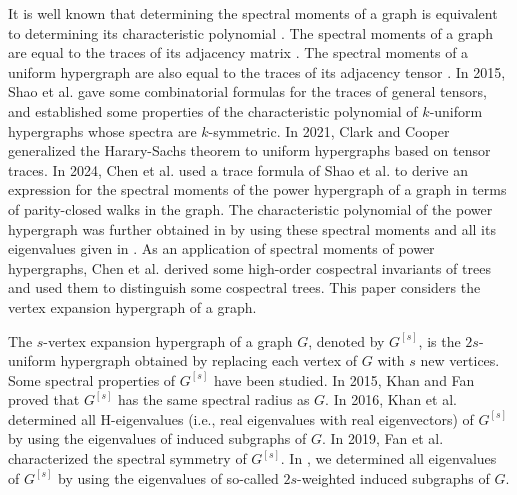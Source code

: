 \documentclass{article}
\begin{document}
It is well known that determining the spectral moments of a graph is equivalent to determining its characteristic polynomial \cite{van2003graphs}.
The spectral moments of a graph are equal to the traces of its adjacency matrix \cite{cvetkovic1980spectra}.
The spectral moments of a uniform hypergraph are also equal to the traces of its adjacency tensor \cite{hu2013determinants}.
In 2015,
Shao et al. \cite{shao2015some} gave some combinatorial formulas for the traces of general tensors,
and established some properties of the characteristic polynomial of $k$-uniform hypergraphs whose spectra are $k$-symmetric.
In 2021,
Clark and Cooper \cite{clark2021harary} generalized the Harary-Sachs theorem to uniform hypergraphs based on tensor traces.
In 2024,
Chen et al. \cite{chen2024spectra} used a trace formula of Shao et al. to derive an expression for the spectral moments of the power hypergraph of a graph in terms of parity-closed walks in the graph.
The characteristic polynomial of the power hypergraph was further obtained in \cite{chen2024spectra} by using these spectral moments and all its eigenvalues given in \cite{CHEN2023205}.
As an application of spectral moments of power hypergraphs,
Chen et al. \cite{chen2025high} derived some high-order cospectral invariants of trees and used them to distinguish some cospectral trees.
This paper considers the vertex expansion hypergraph of a graph.

The $s$-vertex expansion hypergraph of a graph $G$,
denoted by $G^{[s]}$,
is the $2s$-uniform hypergraph obtained by replacing each vertex of $G$ with $s$ new vertices.
Some spectral properties of $G^{[s]}$ have been studied.
In 2015,
Khan and Fan \cite{Fan2015spectral} proved that $G^{[s]}$ has the same spectral radius as $G$.
In 2016,
Khan et al. \cite{khan2016h} determined all $\mathrm{H}$-eigenvalues (i.e., real eigenvalues with real eigenvectors) of $G^{[s]}$ by using the eigenvalues of induced subgraphs of $G$.
In 2019,
Fan et al. \cite{fan2019spectral} characterized the spectral symmetry of $G^{[s]}$.
In \cite{lin2026eigenvalue},
we determined all eigenvalues of $G^{[s]}$ by using the eigenvalues of so-called $2s$-weighted induced subgraphs of $G$.
\end{document}
